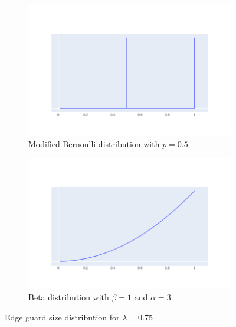 \begin{figure}[H]
\centering
\begin{subfigure}{.5\textwidth}
	\centering
	\includegraphics[width=\linewidth]{Dists/Bernoulli75.png}
	\caption{Modified Bernoulli distribution with $p=0.5$}
\end{subfigure}%
\begin{subfigure}{.5\textwidth}
	\centering
	\includegraphics[width=\linewidth]{Dists/Beta75.png}
	\caption{Beta distribution with $\beta=1$ and $\alpha=3$}
\end{subfigure}
\caption{Edge guard size distribution for $\lambda = 0.75$}
\label{fig:dist_lambda75}
\end{figure}%
